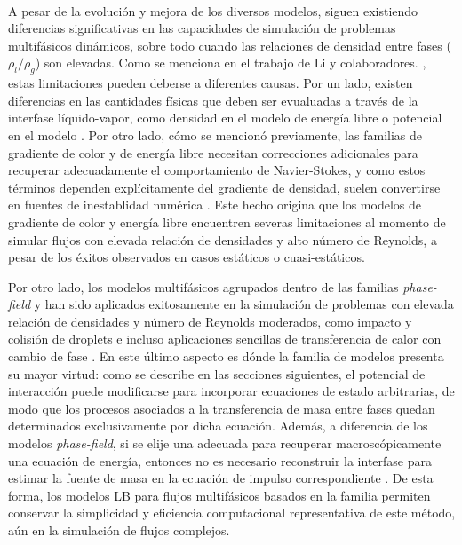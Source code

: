 \\
\par

A pesar de la evoluci\'on y mejora de los diversos modelos, siguen existiendo diferencias significativas en las capacidades de simulaci\'on de problemas multif\'asicos din\'amicos, sobre todo cuando las relaciones de densidad entre fases ($\rho_l/\rho_g$) son elevadas. Como se menciona en el trabajo de Li y colaboradores. \cite{li_lattice_2016}, estas limitaciones pueden deberse a diferentes causas. Por un lado, existen diferencias en las cantidades f\'isicas que deben ser evualuadas a trav\'es de la interfase l\'iquido-vapor, como densidad en el modelo de energ\'ia libre o potencial en el modelo \pp{}. Por otro lado, c\'omo se mencion\'o previamente, las familias de gradiente de color y de energ\'ia libre necesitan correcciones adicionales para recuperar adecuadamente el comportamiento de Navier-Stokes, y como estos t\'erminos dependen expl\'icitamente del gradiente de densidad, suelen convertirse en fuentes de inestablidad num\'erica \cite{leclaire_unsteady_2014,leclaire_enhanced_2013,huang_simulations_2013}. Este hecho origina que los modelos de gradiente de color y energ\'ia libre encuentren severas limitaciones al momento de simular flujos con elevada relaci\'on de densidades y alto n\'umero de Reynolds, a pesar de los \'exitos observados en casos est\'aticos o cuasi-est\'aticos.

Por otro lado, los modelos multif\'asicos agrupados dentro de las familias \emph{phase-field} y \pp{} han sido aplicados exitosamente en la simulaci\'on de problemas con elevada relaci\'on de densidades y n\'umero de Reynolds moderados, como impacto y colisi\'on de droplets \cite{li_lattice_2013,lee_stable_2005} e incluso aplicaciones sencillas de transferencia de calor con cambio de fase \cite{safari_consistent_2014,markus_pool_2012,gong_lattice_2015}. En este \'ultimo aspecto es d\'onde la familia de modelos \pp{} presenta su mayor virtud: como se describe en las secciones siguientes, el potencial de interacci\'on puede modificarse para incorporar ecuaciones de estado arbitrarias, de modo que los procesos asociados a la transferencia de masa entre fases quedan determinados exclusivamente por  dicha ecuaci\'on. Adem\'as, a diferencia de los modelos \emph{phase-field}, si se elije una \lbe{} adecuada para recuperar macrosc\'opicamente una ecuaci\'on de energ\'ia, entonces no es necesario reconstruir la interfase para estimar la fuente de masa en la ecuaci\'on de impulso correspondiente \cite{safari_consistent_2014,safari_extended_2013}. De esta forma, los modelos LB para flujos multif\'asicos basados en la familia \pp{} permiten conservar la simplicidad y eficiencia computacional representativa de este m\'etodo, a\'un en la simulaci\'on de flujos complejos.


